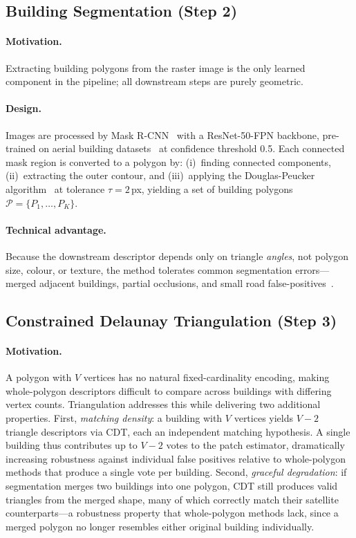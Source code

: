 \documentclass[10pt]{article}
\theoremstyle{plain}
\theoremstyle{definition}
\begin{document}
\subsection{Building Segmentation (Step 2)}
\label{sec:seg}

\paragraph{Motivation.}
Extracting building polygons from the raster image is the only learned
component in the pipeline; all downstream steps are purely geometric.

\paragraph{Design.}
Images are processed by Mask R-CNN~\cite{he2017maskrcnn} with a ResNet-50-FPN
backbone, pre-trained on aerial building
datasets~\cite{ji2018building,fang2021building} at confidence threshold 0.5.
Each connected mask region is converted to a polygon by: (i)~finding connected
components, (ii)~extracting the outer contour, and (iii)~applying the
Douglas-Peucker algorithm~\cite{douglas1973peucker} at tolerance
$\tau=2$\,px, yielding a set of building polygons
$\mathcal{P} = \{P_1,\ldots,P_K\}$.

\paragraph{Technical advantage.}
Because the downstream descriptor depends only on triangle \emph{angles}, not
polygon size, colour, or texture, the method tolerates common segmentation
errors---merged adjacent buildings, partial occlusions, and small road
false-positives~\cite{ouyang2024cfbvm}.

\subsection{Constrained Delaunay Triangulation (Step 3)}
\label{sec:cdt}

\paragraph{Motivation.}
A polygon with $V$ vertices has no natural fixed-cardinality encoding, making
whole-polygon descriptors difficult to compare across buildings with differing
vertex counts.
Triangulation addresses this while delivering two additional properties.
First, \emph{matching density}: a building with $V$ vertices yields $V-2$
triangle descriptors via CDT, each an independent matching hypothesis.
A single building thus contributes up to $V-2$ votes to the patch estimator,
dramatically increasing robustness against individual false positives relative
to whole-polygon methods that produce a single vote per building.
Second, \emph{graceful degradation}: if segmentation merges two buildings into
one polygon, CDT still produces valid triangles from the merged shape, many of
which correctly match their satellite counterparts---a robustness property
that whole-polygon methods lack, since a merged polygon no longer resembles
either original building individually.
\end{document}
